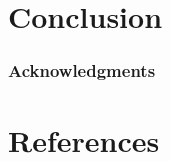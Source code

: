 \documentclass{article}
\begin{document}
\section{Conclusion}

\subsubsection*{Acknowledgments}

\section*{References}

\small


\end{document}
